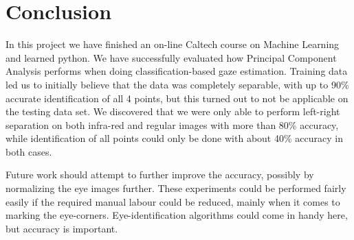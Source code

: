\section{Conclusion}
In this project we have finished an on-line Caltech course on Machine Learning and learned python.
We have successfully evaluated how Principal Component Analysis performs when doing classification-based gaze estimation.
Training data led us to initially believe that the data was completely separable, with up to 90\% accurate identification of all 4 points, but this turned out to not be applicable on the testing data set.
We discovered that we were only able to perform left-right separation on both infra-red and regular images with more than 80\% accuracy, while identification of all points could only be done with about 40\% accuracy in both cases.

Future work should attempt to further improve the accuracy, possibly by normalizing the eye images further.
These experiments could  be performed fairly easily if the required manual labour could be reduced, mainly when it comes to marking the eye-corners.
Eye-identification algorithms could come in handy here, but accuracy is important.